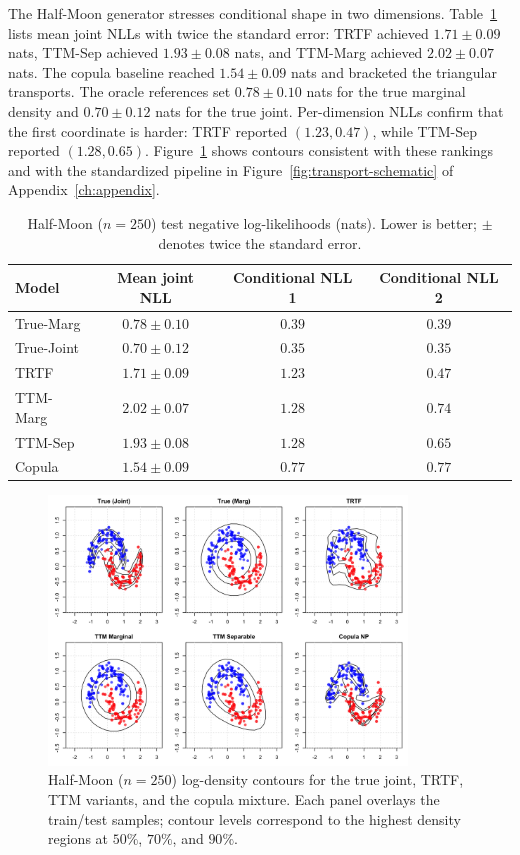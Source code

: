 \documentclass[11pt,a4paper,twoside]{book}\usepackage[]{graphicx}\usepackage[]{xcolor}
\begin{document}
The Half-Moon generator stresses conditional shape in two dimensions. Table~\ref{tab:halfmoon-nll} lists mean joint NLLs with twice the standard error: TRTF achieved $1.71 \pm 0.09$ nats, TTM-Sep achieved $1.93 \pm 0.08$ nats, and TTM-Marg achieved $2.02 \pm 0.07$ nats. The copula baseline reached $1.54 \pm 0.09$ nats and bracketed the triangular transports. The oracle references set $0.78 \pm 0.10$ nats for the true marginal density and $0.70 \pm 0.12$ nats for the true joint. Per-dimension NLLs confirm that the first coordinate is harder: TRTF reported $(1.23, 0.47)$, while TTM-Sep reported $(1.28, 0.65)$. Figure~\ref{fig:halfmoon-panels} shows contours consistent with these rankings and with the standardized pipeline in Figure~\ref{fig:transport-schematic} of Appendix~\ref{ch:appendix}.

\begin{table}[htbp]
  \centering
  \caption{Half-Moon ($n=250$) test negative log-likelihoods (nats). Lower is better; $\pm$ denotes twice the standard error.}
  \label{tab:halfmoon-nll}
  \begin{tabular}{lccc}
    \hline
    Model & Mean joint NLL & Conditional NLL 1 & Conditional NLL 2 \\
    \hline
    True-Marg      & $0.78 \pm 0.10$ & $0.39$ & $0.39$ \\
    True-Joint     & $0.70 \pm 0.12$ & $0.35$ & $0.35$ \\
    TRTF             & $1.71 \pm 0.09$ & $1.23$ & $0.47$ \\
    TTM-Marg         & $2.02 \pm 0.07$ & $1.28$ & $0.74$ \\
    TTM-Sep          & $1.93 \pm 0.08$ & $1.28$ & $0.65$ \\
    Copula           & $1.54 \pm 0.09$ & $0.77$ & $0.77$ \\
    \hline
  \end{tabular}
\end{table}

\begin{figure}[htbp]
  \centering
  \includegraphics[width=0.85\textwidth]{halfmoon_panels_seed007_N250.png}
  \caption{Half-Moon ($n=250$) log-density contours for the true joint, TRTF, TTM variants, and the copula mixture. Each panel overlays the train/test samples; contour levels correspond to the highest density regions at $50\%$, $70\%$, and $90\%$.}
  \label{fig:halfmoon-panels}
\end{figure}
\end{document}
